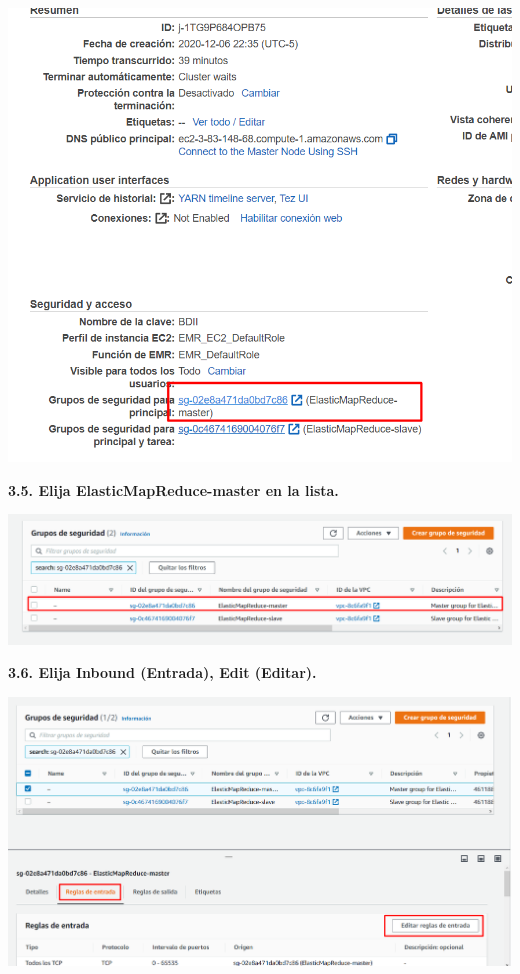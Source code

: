 \documentclass{article}
\begin{document}
    \begin{center}
		\includegraphics[width=15cm]{./images/13} 
	\end{center}

\newpage
\textbf{3.5. Elija ElasticMapReduce-master en la lista. 
}

    \begin{center}
		\includegraphics[width=15cm]{./images/14} 
	\end{center}
\textbf{3.6. Elija Inbound (Entrada), Edit (Editar). 
}

    \begin{center}
		\includegraphics[width=15cm]{./images/15} 
	\end{center}
\end{document}

